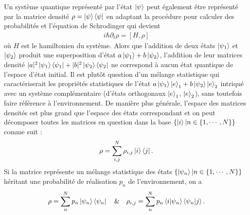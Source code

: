 Un système quantique représenté par l'état $\ket{\psi}$ peut également être représenté par la matrice densité $\rho = \ket{\psi}\bra{\psi}$ en adaptant la procédure pour calculer des probabilités et l'équation de Schrodinger qui devient 
\begin{align}
    i\hbar \partial_t \rho =  [H, \rho] \label{schro}
\end{align}
où $H$ est le hamiltonien du système.
Alors que l'addition de deux états $\ket{\psi_1}$ et $\ket{\psi_2}$ produit une superposition d'état $a\ket{\psi_1}+b\ket{\psi_2}$, l'addition de leur matrices densité $|a|^2\ket{\psi_1}\bra{\psi_1}+|b|^2\ket{\psi_2}\bra{\psi_2}$ ne correspond à aucun état quantique de l'espace d'état initial. Il est plutôt question d'un mélange statistique qui caractériserait les propriétés statistiques de l'état $a\ket{\psi_1}\ket{e}_1 + b\ket{\psi_2}\ket{e}_2$ intriqué avec un système complémentaire (d'états orthogonaux $\ket{e}_1$, $\ket{e}_2$), sans toutefois faire référence à l'environnement. De manière plus générale, l'espace des matrices densités est plus grand que l'espace des états correspondant et on peut décomposer toutes les matrices en question dans la base $\{\ket{i}| n\in \{1, \cdots, N\}\}$ comme suit :
\begin{align}
    \rho = \sum_{i, j}^{N} \rho_{i, j} \ket{i}\bra{j}. \label{gen_def}
\end{align}  
Si la matrice représente un mélange statistique des états $\{\ket{\psi_n}| n\in \{1, \cdots, N\}\}$ héritant une probabilité de réalisation $p_n$ de l'environnement,  on a
\begin{align}
    \rho = \sum_{n}^{N} p_{n} \ket{\psi_n}\bra{\psi_n}\quad \& \quad \rho_{i, j} = \sum_n^{N} p_n\bra{i}\ket{\psi_n}\bra{\psi_n}\ket{j}. \label{gen_def2}
\end{align}  
